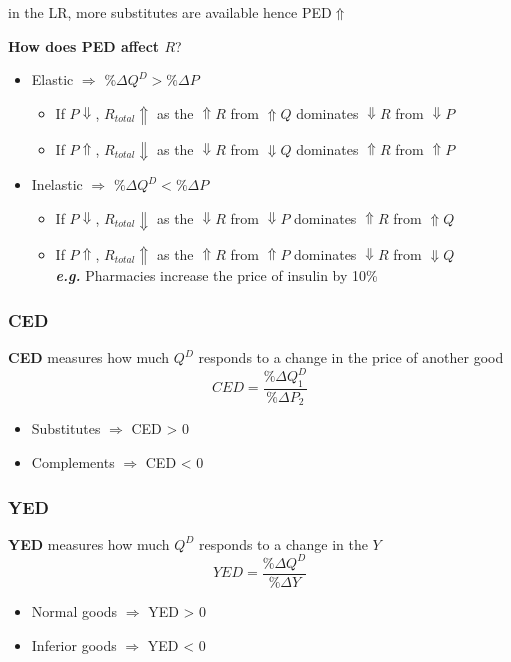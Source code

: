 \documentclass{article}
\newcommand{\eg}[0]{\textit{e.g. }}
\begin{document}
\begin{multicols}{2}
\begin{itemize}
	in the LR, more substitutes are available hence PED$\Uparrow$\\
\end{itemize}
\textbf{How does PED affect $R$}?
\begin{itemize}
	\item Elastic $\Rightarrow$ $\%\Delta Q^D > \%\Delta P$
	\begin{itemize}
		\item If $P \Downarrow$, $R_{total} \Uparrow$ as the $\Uparrow R$ from $\Uparrow Q$ dominates $\Downarrow R$ from $\Downarrow P$
		\item If $P \Uparrow$, $R_{total} \Downarrow$ as the $\Downarrow R$ from $\Downarrow Q$ dominates $\Uparrow R$ from $\Uparrow P$
	\end{itemize}
	\item Inelastic $\Rightarrow$ $\%\Delta Q^D < \%\Delta P$
	\begin{itemize}
		\item If $P \Downarrow$, $R_{total} \Downarrow$ as the $\Downarrow R$ from $\Downarrow P$ dominates $\Uparrow R$ from $\Uparrow Q$
		\item If $P \Uparrow$, $R_{total} \Uparrow$ as the $\Uparrow R$ from $\Uparrow P$ dominates $\Downarrow R$ from $\Downarrow Q$ \\
		\textbf{\eg} Pharmacies increase the price of insulin by 10\%
	\end{itemize}
\end{itemize}

\subsubsection{CED}
\textbf{CED} measures how much $Q^D$ responds to a change in the price of another good
$$CED = \frac{\%\Delta Q^D_1}{\%\Delta P_2}$$
\begin{itemize}
	\item Substitutes $\Rightarrow$ CED > 0
	\item Complements $\Rightarrow$ CED < 0
\end{itemize}

\subsubsection{YED}
\textbf{YED} measures how much $Q^D$ responds to a change in the $Y$
$$YED = \frac{\%\Delta Q^D}{\%\Delta Y}$$
\begin{itemize}
	\item Normal goods $\Rightarrow$ YED > 0
	\item Inferior goods $\Rightarrow$ YED < 0
\end{itemize}


\end{multicols}
\end{document}
